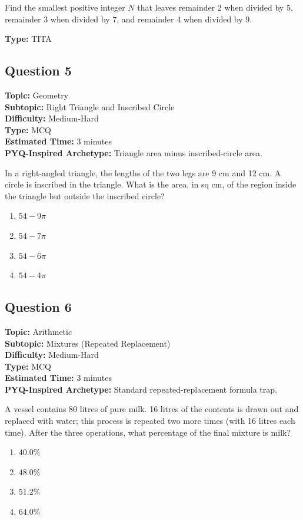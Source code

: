 \documentclass[11pt]{article}
\begin{document}
\begin{tcolorbox}
Find the smallest positive integer \(N\) that leaves remainder 2 when divided by 5, remainder 3 when divided by 7, and remainder 4 when divided by 9.
\end{tcolorbox}
\textbf{Type:} TITA

\subsection*{Question 5}
\textbf{Topic:} Geometry \\
\textbf{Subtopic:} Right Triangle and Inscribed Circle \\
\textbf{Difficulty:} Medium-Hard \\
\textbf{Type:} MCQ \\
\textbf{Estimated Time:} 3 minutes \\
\textbf{PYQ-Inspired Archetype:} Triangle area minus inscribed-circle area.

\begin{tcolorbox}
In a right-angled triangle, the lengths of the two legs are 9 cm and 12 cm. A circle is inscribed in the triangle. What is the area, in sq cm, of the region inside the triangle but outside the inscribed circle?
\end{tcolorbox}
\begin{enumerate}[label=(\Alph*)]
\item \(54 - 9\pi\)
\item \(54 - 7\pi\)
\item \(54 - 6\pi\)
\item \(54 - 4\pi\)
\end{enumerate}

\subsection*{Question 6}
\textbf{Topic:} Arithmetic \\
\textbf{Subtopic:} Mixtures (Repeated Replacement) \\
\textbf{Difficulty:} Medium-Hard \\
\textbf{Type:} MCQ \\
\textbf{Estimated Time:} 3 minutes \\
\textbf{PYQ-Inspired Archetype:} Standard repeated-replacement formula trap.

\begin{tcolorbox}
A vessel contains 80 litres of pure milk. 16 litres of the contents is drawn out and replaced with water; this process is repeated two more times (with 16 litres each time). After the three operations, what percentage of the final mixture is milk?
\end{tcolorbox}
\begin{enumerate}[label=(\Alph*)]
\item \(40.0\%\)
\item \(48.0\%\)
\item \(51.2\%\)
\item \(64.0\%\)
\end{enumerate}
\end{document}
